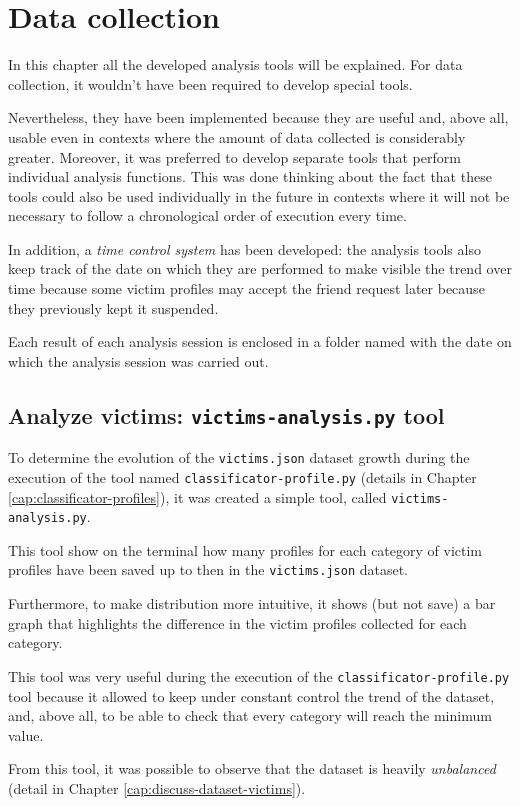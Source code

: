 
\chapter{Data collection}
\label{cap:data-collection}
In this chapter all the developed analysis tools will be explained. For data collection, it wouldn't have been required to develop special tools.
\par \noindent Nevertheless, they have been implemented because they are useful and, above all, usable even in contexts where the amount of data collected is considerably greater. Moreover, it was preferred to develop separate tools that perform individual analysis functions. This was done thinking about the fact that these tools could also be used individually in the future in contexts where it will not be necessary to follow a chronological order of execution every time.
\par \noindent In addition, a \textit{time control system} has been developed: the analysis tools also keep track of the date on which they are performed to make visible the trend over time because some victim profiles may accept the friend request later because they previously kept it suspended.
\par \noindent
Each result of each analysis session is enclosed in a folder named with the date on which the analysis session was carried out.

\section{Analyze victims: \texttt{victims-analysis.py} tool}
\label{cap:victims-analysis}
To determine the evolution of the \texttt {victims.json} dataset growth during the execution of the tool named \texttt {classificator-profile.py} (details in Chapter \ref{cap:classificator-profiles}), it was created a simple tool, called \texttt{victims-analysis.py}. \par \noindent This tool show on the terminal how many profiles for each category of victim profiles have been saved up to then in the \texttt{victims.json} dataset.
\par \noindent Furthermore, to make distribution more intuitive, it shows (but not save) a bar graph that highlights the difference in the victim profiles collected for each category.
\par \noindent This tool was very useful during the execution of the \texttt{classificator-profile.py} tool because it allowed to keep under constant control the trend of the dataset, and, above all, to be able to check that every category will reach the minimum value. 
\par \noindent From this tool, it was possible to observe that the dataset is heavily \textit{unbalanced} (detail in Chapter \ref{cap:discuss-dataset-victims}).

